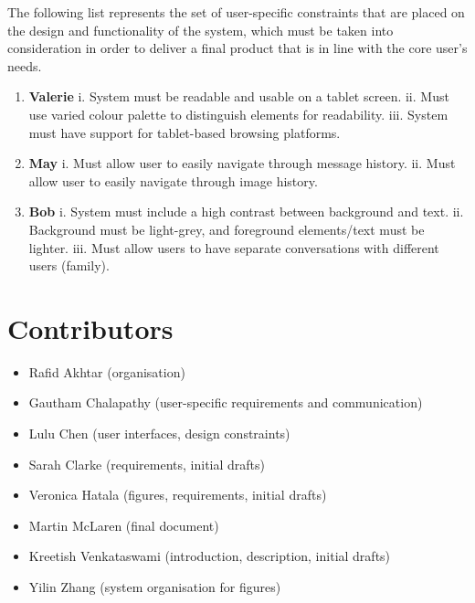\documentclass[11pt]{article}
\begin{document}
The following list represents the set of user-specific constraints that are placed on the design and
functionality of the system, which must be taken into consideration in order to deliver a final
product that is in line with the core user's needs.
\begin{enumerate}[label=\alph*.]
    \item \textbf{Valerie}
        \subitem i. System must be readable and usable on a tablet screen.
        \subitem ii. Must use varied colour palette to distinguish elements for readability.
        \subitem iii. System must have support for tablet-based browsing platforms.
    \item \textbf{May}
        \subitem i. Must allow user to easily navigate through message history.
        \subitem ii. Must allow user to easily navigate through image history.
    \item \textbf{Bob}
        \subitem i. System must include a high contrast between background and text.
        \subitem ii. Background must be light-grey, and foreground elements/text must be lighter.
        \subitem iii. Must allow users to have separate conversations with different users (family).
\end{enumerate}

\pagebreak

\section*{Contributors}

\begin{itemize}
    \item Rafid Akhtar (organisation)
    \item Gautham Chalapathy (user-specific requirements and communication)
    \item Lulu Chen (user interfaces, design constraints)
    \item Sarah Clarke (requirements, initial drafts)
    \item Veronica Hatala (figures, requirements, initial drafts)
    \item Martin McLaren (final document)
    \item Kreetish Venkataswami (introduction, description, initial drafts)
    \item Yilin Zhang (system organisation for figures)
\end{itemize}
\end{document}
